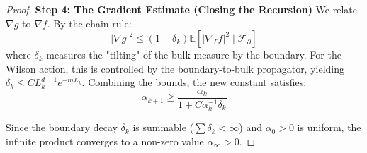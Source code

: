 \begin{proof}
\textbf{Step 4: The Gradient Estimate (Closing the Recursion)}
We relate $\nabla g$ to $\nabla f$. By the chain rule:
\begin{equation}
|\nabla g|^2 \le (1 + \delta_k) \mathbb{E}[|\nabla_\Gamma f|^2 \mid \mathcal{F}_\partial]
\end{equation}
where $\delta_k$ measures the "tilting" of the bulk measure by the boundary. For the Wilson action, this is controlled by the boundary-to-bulk propagator, yielding $\delta_k \le C L_k^{d-1} e^{-m L_k}$.
Combining the bounds, the new constant satisfies:
\begin{equation}
\alpha_{k+1} \ge \frac{\alpha_k}{1 + C \alpha_k^{-1} \delta_k}
\end{equation}

Since the boundary decay $\delta_k$ is summable ($\sum \delta_k < \infty$) and $\alpha_0 > 0$ is uniform, the infinite product converges to a non-zero value $\alpha_\infty > 0$.
\end{proof}


